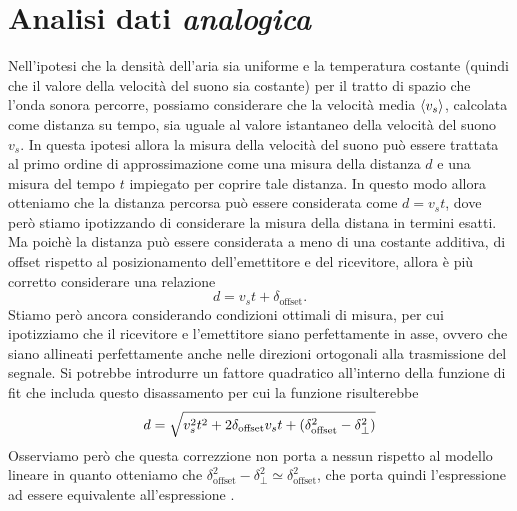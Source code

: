 \documentclass[
    rmp,
    reprint, 
    superscriptaddress, 
    altaffilletter, 
    amsmath, 
    amssymb, 
    a4paper,
    varvw]{revtex4-2}
\begin{document}
\section{Analisi dati \emph{analogica}}

Nell'ipotesi che la densità dell'aria sia uniforme e la temperatura costante (quindi che il valore della velocità del suono sia costante) per il tratto di spazio che l'onda sonora percorre, possiamo considerare che la velocità media $\expval{v_s}$, calcolata come distanza su tempo, sia uguale al valore istantaneo della velocità del suono $v_s$. In questa ipotesi allora la misura della velocità del suono può essere trattata al primo ordine di approssimazione come una misura della distanza $d$ e una misura del tempo $t$ impiegato per coprire tale distanza. In questo modo allora otteniamo che la distanza percorsa può essere considerata come $d=v_st$, dove però stiamo ipotizzando di considerare la misura della distana in termini esatti. Ma poichè la distanza può essere considerata a meno di una costante additiva, di offset rispetto al posizionamento dell'emettitore e del ricevitore, allora è più corretto considerare una relazione \begin{equation}
    d=v_st + \delta_\text{offset}\label{eq:first_order_approx}.
\end{equation} Stiamo però ancora considerando condizioni ottimali di misura, per cui ipotizziamo che il ricevitore e l'emettitore siano perfettamente in asse, ovvero che siano allineati perfettamente anche nelle direzioni ortogonali alla trasmissione del segnale. Si potrebbe introdurre un fattore quadratico all'interno della funzione di fit che includa questo disassamento per cui la funzione risulterebbe \begin{equation}
    d=\sqrt{v_s^2t^2+2\delta_\text{offset}v_st+\qty(\delta_\text{offset}^2-\delta_\perp^2)} \label{eq:second_order_approx}
\end{equation}
Osserviamo però che questa correzzione non porta a nessun rispetto al modello lineare in quanto otteniamo che $\delta_\text{offset}^2-\delta_\perp^2 \simeq \delta_\text{offset}^2$, che porta quindi l'espressione  ad essere equivalente all'espressione .
\end{document}
